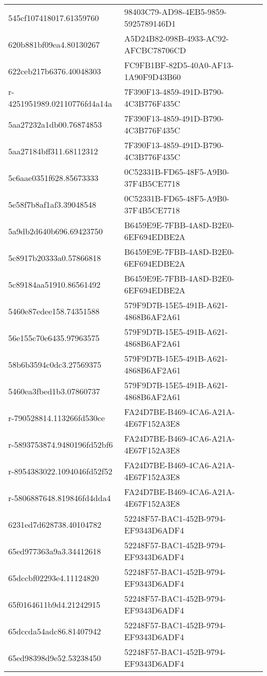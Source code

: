 \begin{tabular}{ll}
545cf107418017.61359760 & 98403C79-AD98-4EB5-9859-5925789146D1 \\
620b881bf09ea4.80130267 & A5D24B82-098B-4933-AC92-AFCBC78706CD \\
622ceb217b6376.40048303 & FC9FB1BF-82D5-40A0-AF13-1A90F9D43B60 \\
r-4251951989.02110776fd4a14a & 7F390F13-4859-491D-B790-4C3B776F435C \\
5aa27232a1db00.76874853 & 7F390F13-4859-491D-B790-4C3B776F435C \\
5aa27184bff311.68112312 & 7F390F13-4859-491D-B790-4C3B776F435C \\
5c6aae0351f628.85673333 & 0C52331B-FD65-48F5-A9B0-37F4B5CE7718 \\
5e58f7b8af1af3.39048548 & 0C52331B-FD65-48F5-A9B0-37F4B5CE7718 \\
5a9db2d640b696.69423750 & B6459E9E-7FBB-4A8D-B2E0-6EF694EDBE2A \\
5c8917b20333a0.57866818 & B6459E9E-7FBB-4A8D-B2E0-6EF694EDBE2A \\
5c89184aa51910.86561492 & B6459E9E-7FBB-4A8D-B2E0-6EF694EDBE2A \\
5460e87edee158.74351588 & 579F9D7B-15E5-491B-A621-4868B6AF2A61 \\
56e155c70e6435.97963575 & 579F9D7B-15E5-491B-A621-4868B6AF2A61 \\
58b6b3594c0dc3.27569375 & 579F9D7B-15E5-491B-A621-4868B6AF2A61 \\
5460ea3fbed1b3.07860737 & 579F9D7B-15E5-491B-A621-4868B6AF2A61 \\
r-790528814.113266fd530ce & FA24D7BE-B469-4CA6-A21A-4E67F152A3E8 \\
r-5893753874.9480196fd52bf6 & FA24D7BE-B469-4CA6-A21A-4E67F152A3E8 \\
r-8954383022.1094046fd52f52 & FA24D7BE-B469-4CA6-A21A-4E67F152A3E8 \\
r-5806887648.819846fd4dda4 & FA24D7BE-B469-4CA6-A21A-4E67F152A3E8 \\
6231ed7d628738.40104782 & 52248F57-BAC1-452B-9794-EF9343D6ADF4 \\
65ed977363a9a3.34412618 & 52248F57-BAC1-452B-9794-EF9343D6ADF4 \\
65dccbf02293e4.11124820 & 52248F57-BAC1-452B-9794-EF9343D6ADF4 \\
65f0164611b9d4.21242915 & 52248F57-BAC1-452B-9794-EF9343D6ADF4 \\
65dccda54adc86.81407942 & 52248F57-BAC1-452B-9794-EF9343D6ADF4 \\
65ed98398d9e52.53238450 & 52248F57-BAC1-452B-9794-EF9343D6ADF4 \\

\end{tabular}
